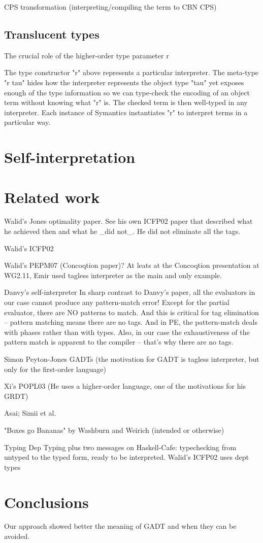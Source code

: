 CPS transformation (interpreting/compiling the term to CBN CPS)

\subsection{Translucent types}
The crucial role of the higher-order type parameter r

The type constructor "r" above represents a particular interpreter.  The
meta-type "r tau" hides how the interpreter represents the object type
"tau" yet exposes enough of the type information so we can type-check
the encoding of an object term without knowing what "r" is.  The checked
term is then well-typed in any interpreter.  Each instance of Symantics
instantiates "r" to interpret terms in a particular way.

\section{Self-interpretation}



\section{Related work}
Walid's Jones optimality paper. See his own ICFP02 paper that
described what he achieved then and what he _did not_. He did not
eliminate all the tags.

Walid's ICFP02

Walid's PEPM07 (Concoqtion paper)? At leats at the Concoqtion
presentation at WG2.11, Emir used tagless interpreter as the main and
only example.

Danvy's self-interpreter
In sharp contrast to Danvy's paper, all the evaluators in our case
cannot produce any pattern-match error! Except for the partial
evaluator, there are NO patterns to match. And this is critical for
tag elimination -- pattern matching means there are no tags. And in
PE, the pattern-match deals with phases rather than with types. Also,
in our case the exhaustiveness of the pattern match is apparent to the
compiler -- that's why there are no tags.

Simon Peyton-Jones GADTs (the motivation for GADT is tagless
interpreter, but only for the first-order language)

Xi's POPL03 (He uses a higher-order language, one of the motivations
for his GRDT)

Asai; Simii et al.

"Boxes go Bananas" by Washburn and Weirich (intended or otherwise)


Typing Dep Typing plus two messages on Haskell-Cafe: typechecking 
from untyped to the typed form, ready to be interpreted. Walid's ICFP02
uses dept types


\section{Conclusions}

Our approach showed better the meaning of GADT and when they can be
avoided.


